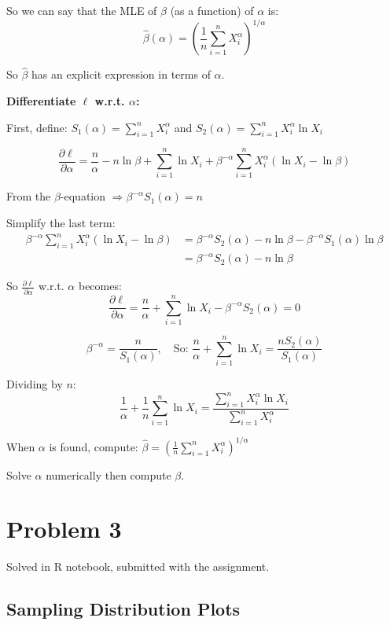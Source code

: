 \documentclass{article}
\begin{document}
So we can say that the MLE of $\beta$ (as a function) of $\alpha$ is:
\[
\boxed{\hat{\beta}(\alpha) = \left(\frac{1}{n} \sum_{i=1}^{n} X_i^\alpha\right)^{1/\alpha}}
\]

So $\hat{\beta}$ has an explicit expression in terms of $\alpha$.

\textbf{Differentiate $\ell$ w.r.t. $\alpha$:}

First, define: $S_1(\alpha) = \sum_{i=1}^{n} X_i^\alpha$ and $S_2(\alpha) = \sum_{i=1}^{n} X_i^\alpha \ln X_i$

\[
\frac{\partial \ell}{\partial \alpha} = \frac{n}{\alpha} - n \ln \beta + \sum_{i=1}^{n} \ln X_i + \beta^{-\alpha} \sum_{i=1}^{n} X_i^\alpha (\ln X_i - \ln \beta)
\]

From the $\beta$-equation $\Rightarrow \beta^{-\alpha} S_1(\alpha) = n$

Simplify the last term:
\begin{align*}
\beta^{-\alpha} \sum_{i=1}^{n} X_i^\alpha (\ln X_i - \ln \beta) &= \beta^{-\alpha} S_2(\alpha) - n \ln \beta - \beta^{-\alpha} S_1(\alpha) \ln \beta \\
&= \beta^{-\alpha} S_2(\alpha) - n \ln \beta
\end{align*}

So $\frac{\partial \ell}{\partial \alpha}$ w.r.t. $\alpha$ becomes:
\[
\frac{\partial \ell}{\partial \alpha} = \frac{n}{\alpha} + \sum_{i=1}^{n} \ln X_i - \beta^{-\alpha} S_2(\alpha) = 0
\]

\[
\boxed{\beta^{-\alpha} = \frac{n}{S_1(\alpha)}, \quad \text{So: } \frac{n}{\alpha} + \sum_{i=1}^{n} \ln X_i = \frac{n S_2(\alpha)}{S_1(\alpha)}}
\]

Dividing by $n$:
\[
\frac{1}{\alpha} + \frac{1}{n}\sum_{i=1}^{n} \ln X_i = \frac{\sum_{i=1}^{n} X_i^\alpha \ln X_i}{\sum_{i=1}^{n} X_i^\alpha}
\]

When $\alpha$ is found, compute: $\hat{\beta} = \left(\frac{1}{n}\sum_{i=1}^{n} X_i^\alpha\right)^{1/\alpha}$

Solve $\alpha$ numerically then compute $\beta$.

\section{Problem 3}

Solved in R notebook, submitted with the assignment.

\subsection{Sampling Distribution Plots}
\end{document}
